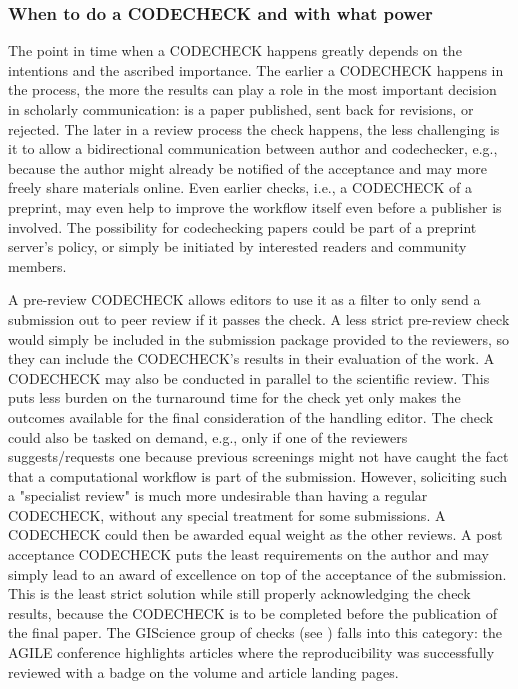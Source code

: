 \documentclass[12pt]{article}
\begin{document}
\subsubsection*{When to do a CODECHECK and with what power}
\label{when-to-do-a-codecheck}

The point in time when a CODECHECK happens greatly depends on the 
intentions and the ascribed
importance. The earlier a CODECHECK happens in the process, the more the
results can play a role in the most important decision in scholarly 
communication: is a paper published, sent back for revisions, or rejected.
The later in a review process the check happens, the less challenging is it
to allow a bidirectional communication between author and codechecker, e.g.,
because the author might already be notified of the acceptance and may more
freely share materials online.
Even earlier checks, i.e., a CODECHECK of a preprint, may even help to 
improve the workflow itself even before a publisher is involved. The 
possibility for codechecking papers could be part of a preprint server's
policy, or simply be initiated by interested readers and community members.

A pre-review CODECHECK allows editors to use it as a filter to only send 
a submission out to peer review if it passes the check. A less strict
pre-review check would simply be included in the submission package provided
to the reviewers, so they can include the CODECHECK's results in their 
evaluation of the work.
A CODECHECK may also be conducted in parallel to the scientific review. This
puts less burden on the turnaround time for the check yet only makes the 
outcomes available for the final consideration of the handling editor.
The check could also be tasked on demand, e.g., only if one of the reviewers
suggests/requests one because previous screenings might not have caught the 
fact that a computational workflow is part of the submission. However, 
soliciting such a "specialist review" is much more undesirable than having
a regular CODECHECK, without any special treatment for some submissions.
A CODECHECK could then be awarded equal weight as the other reviews.
A post acceptance CODECHECK puts the least requirements on the author and may
simply lead to an award of excellence on top of the acceptance of the
submission. This is the least strict solution while still properly 
acknowledging the check results, because the CODECHECK is to be completed 
before the publication of the final paper.
The GIScience group of checks (see ) falls into this
category: the AGILE conference highlights articles where the reproducibility
was successfully reviewed with a badge on the volume and article landing
pages.
\end{document}
